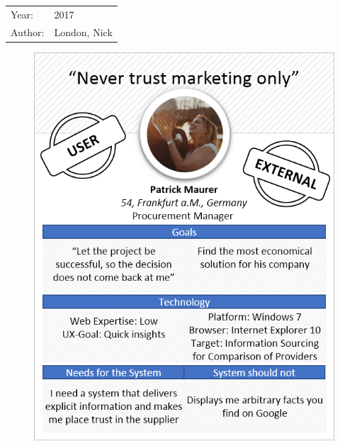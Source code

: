 \begin{tabular}{l l}
Year: & 2017 \\
Author: & London, Nick \\
\end{tabular}
\label{persbegin}
\begin{figure}[H] 
        \centering\includegraphics[width=\textwidth]{img/diagrams/personas/customer1.png}
	\captionsetup{labelformat=empty}
        \caption[]{}
\end{figure}
